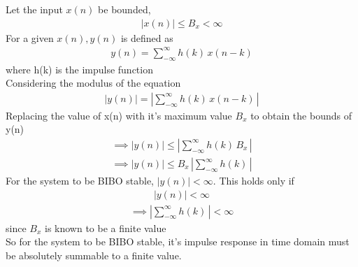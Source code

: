 \documentclass[journal,12pt,twocolumn]{IEEEtran}
\begin{document}
Let the input $x(n)$ be bounded, \\
\begin{align}
    |x(n)|\leq B_x<\infty
\end{align}
For a given $x(n), y(n)$ is defined as
\begin{align}
    y(n)=\sum_{-\infty}^{\infty}h(k)\,x(n-k)
\end{align}
where h(k) is the impulse function\bigskip\\ 
Considering the modulus of the equation\\
\begin{align}
    |y(n)|=|\sum_{-\infty}^{\infty}h(k)\,x(n-k)\,|
\end{align}
Replacing the value of x(n) with it's maximum value $B_x$ to obtain the bounds of y(n)
\begin{align}
    \implies |y(n)| \leq |\sum_{-\infty}^{\infty}h(k)\,B_x\,|\\
    \implies |y(n)| \leq B_x\,|\sum_{-\infty}^{\infty}h(k)\,|
\end{align}
For the system to be BIBO stable, $|y(n)| < \infty$. This holds only if 
\begin{align}
    |y(n)| < \infty
\end{align}
\begin{align}
    \implies |\sum_{-\infty}^{\infty}h(k)\,| < \infty
\end{align}
since $B_x$ is known to be a finite value\medskip \\
So for the system to be BIBO stable, it's impulse response in time domain must be absolutely summable to a finite value.\bigskip  
\end{document}
